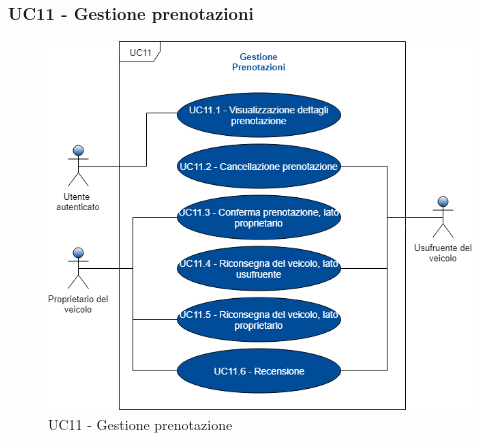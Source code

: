 \subsubsection{UC11 - Gestione prenotazioni}
\begin{figure}[h]
	\includegraphics[width=12cm]{res/images/UC11Prenotazione.png}
	\centering
	\caption{UC11 - Gestione prenotazione}
\end{figure}
